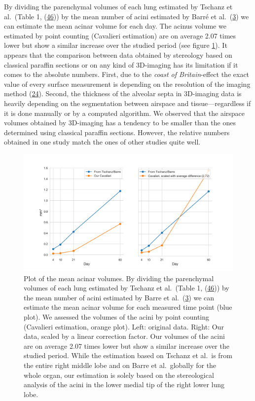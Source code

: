 \documentclass[
  american,
]{article}
\begin{document}
By dividing the parenchymal volumes of each lung estimated by Tschanz et al.~(Table 1, (\protect\hyperlink{ref-wnl86DEM}{46})) by the mean number of acini estimated by Barré et al.~(\protect\hyperlink{ref-uFNlWogb}{3}) we can estimate the mean acinar volume for each day.
The acinus volume we estimated by point counting (Cavalieri estimation) are on average 2.07 times lower but show a similar increase over the studied period (see figure \ref{fig:06}).
It appears that the comparison between data obtained by stereology based on classical paraffin sections or on any kind of 3D-imaging has its limitation if it comes to the absolute numbers.
First, due to the \emph{coast of Britain}-effect the exact value of every surface measurement is depending on the resolution of the imaging method (\protect\hyperlink{ref-AdXhaEV4}{24}).
Second, the thickness of the alveolar septa in 3D-imaging data is heavily depending on the segmentation between airspace and tissue---regardless if it is done manually or by a computed algorithm.
We observed that the airspace volumes obtained by 3D-imaging has a tendency to be smaller than the ones determined using classical paraffin sections.
However, the relative numbers obtained in one study match the ones of other studies quite well.

\begin{figure}
\hypertarget{fig:06}{%
\centering
\includegraphics{images/fig06.png}
\caption{Plot of the mean acinar volumes.
By dividing the parenchymal volumes of each lung estimated by Tschanz et al.~(Table 1, (\protect\hyperlink{ref-wnl86DEM}{46})) by the mean number of acini estimated by Barre et al.~(\protect\hyperlink{ref-uFNlWogb}{3}) we can estimate the mean acinar volume for each measured time point (blue plot).
We assessed the volumes of the acini by point counting (Cavalieri estimation, orange plot).
Left: original data.
Right: Our data, scaled by a linear correction factor.
Our volumes of the acini are on average 2.07 times lower but show a similar increase over the studied period.
While the estimation based on Tschanz et al.~is from the entire right middle lobe and on Barre et al.~globally for the whole organ, our estimation is solely based on the stereological analysis of the acini in the lower medial tip of the right lower lung lobe.}\label{fig:06}
}
\end{figure}
\end{document}
